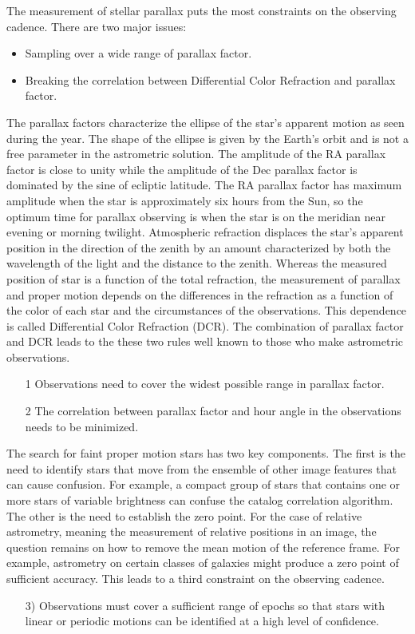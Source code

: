 \medskip
The measurement of stellar parallax puts the most constraints on the
observing cadence.  There are two major issues:
\begin{itemize}
\item Sampling over a wide range of parallax factor.
\item Breaking the correlation between Differential Color Refraction
and parallax factor.
\end{itemize}
The parallax factors characterize the ellipse of the star's apparent motion
as seen during the year.  The shape of the ellipse is given by the Earth's
orbit and is not a free parameter in the astrometric solution.  The
amplitude of the RA parallax factor is close to unity while the amplitude
of the Dec parallax factor is dominated by the sine of ecliptic latitude.
The RA parallax factor has maximum amplitude when the star is approximately
six hours from the Sun, so the optimum time for parallax observing is when the
star is on the meridian near evening or morning twilight.
Atmospheric refraction displaces the star's apparent position in the
direction of the zenith by an amount characterized by both the wavelength
of the light and the distance to the zenith.  Whereas the measured position
of star is a function of the total refraction, the measurement of parallax
and proper motion depends on the differences in the refraction as a function
of the color of each star and the circumstances of the observations.  This
dependence is called Differential Color Refraction (DCR).
The combination of parallax factor and DCR leads to the these two rules
well known to those who make astrometric observations.
\begin{itemize}
\item [1] Observations need to cover the widest possible range in parallax
factor.
\item [2] The correlation between parallax factor and hour angle in the
observations needs to be minimized.
\end{itemize}

The search for faint proper motion stars has two key components.  The first
is the need to identify stars that move from the ensemble of other image
features that can cause confusion.  For example, a compact group of stars
that contains one or more stars of variable brightness can confuse the catalog
correlation algorithm.  The other is the need to establish the zero point.
For the case of relative astrometry, meaning the measurement of relative
positions in an image, the question remains on how to remove the mean motion
of the reference frame.  For example, astrometry on certain classes of galaxies
might produce a zero point of sufficient accuracy.  This leads to a third
constraint on the observing cadence.
\begin{itemize}
\item [3)] Observations must cover a sufficient range of epochs so that stars with
linear or periodic motions can be identified at a high level of confidence.
\end{itemize}


